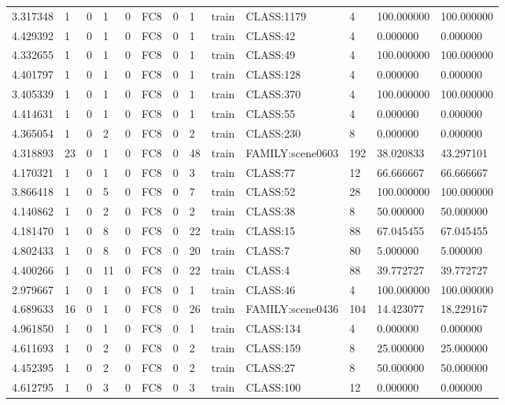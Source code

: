 \begin{tabular}{lllllllllllll}
3.317348 & 1 & 0 & 1 & 0 & FC8 & 0 & 1 & train & CLASS:1179 & 4 & 100.000000 & 100.000000 \\
4.429392 & 1 & 0 & 1 & 0 & FC8 & 0 & 1 & train & CLASS:42 & 4 & 0.000000 & 0.000000 \\
4.332655 & 1 & 0 & 1 & 0 & FC8 & 0 & 1 & train & CLASS:49 & 4 & 100.000000 & 100.000000 \\
4.401797 & 1 & 0 & 1 & 0 & FC8 & 0 & 1 & train & CLASS:128 & 4 & 0.000000 & 0.000000 \\
3.405339 & 1 & 0 & 1 & 0 & FC8 & 0 & 1 & train & CLASS:370 & 4 & 100.000000 & 100.000000 \\
4.414631 & 1 & 0 & 1 & 0 & FC8 & 0 & 1 & train & CLASS:55 & 4 & 0.000000 & 0.000000 \\
4.365054 & 1 & 0 & 2 & 0 & FC8 & 0 & 2 & train & CLASS:230 & 8 & 0.000000 & 0.000000 \\
4.318893 & 23 & 0 & 1 & 0 & FC8 & 0 & 48 & train & FAMILY:scene0603 & 192 & 38.020833 & 43.297101 \\
4.170321 & 1 & 0 & 1 & 0 & FC8 & 0 & 3 & train & CLASS:77 & 12 & 66.666667 & 66.666667 \\
3.866418 & 1 & 0 & 5 & 0 & FC8 & 0 & 7 & train & CLASS:52 & 28 & 100.000000 & 100.000000 \\
4.140862 & 1 & 0 & 2 & 0 & FC8 & 0 & 2 & train & CLASS:38 & 8 & 50.000000 & 50.000000 \\
4.181470 & 1 & 0 & 8 & 0 & FC8 & 0 & 22 & train & CLASS:15 & 88 & 67.045455 & 67.045455 \\
4.802433 & 1 & 0 & 8 & 0 & FC8 & 0 & 20 & train & CLASS:7 & 80 & 5.000000 & 5.000000 \\
4.400266 & 1 & 0 & 11 & 0 & FC8 & 0 & 22 & train & CLASS:4 & 88 & 39.772727 & 39.772727 \\
2.979667 & 1 & 0 & 1 & 0 & FC8 & 0 & 1 & train & CLASS:46 & 4 & 100.000000 & 100.000000 \\
4.689633 & 16 & 0 & 1 & 0 & FC8 & 0 & 26 & train & FAMILY:scene0436 & 104 & 14.423077 & 18.229167 \\
4.961850 & 1 & 0 & 1 & 0 & FC8 & 0 & 1 & train & CLASS:134 & 4 & 0.000000 & 0.000000 \\
4.611693 & 1 & 0 & 2 & 0 & FC8 & 0 & 2 & train & CLASS:159 & 8 & 25.000000 & 25.000000 \\
4.452395 & 1 & 0 & 2 & 0 & FC8 & 0 & 2 & train & CLASS:27 & 8 & 50.000000 & 50.000000 \\
4.612795 & 1 & 0 & 3 & 0 & FC8 & 0 & 3 & train & CLASS:100 & 12 & 0.000000 & 0.000000 \\

\end{tabular}
